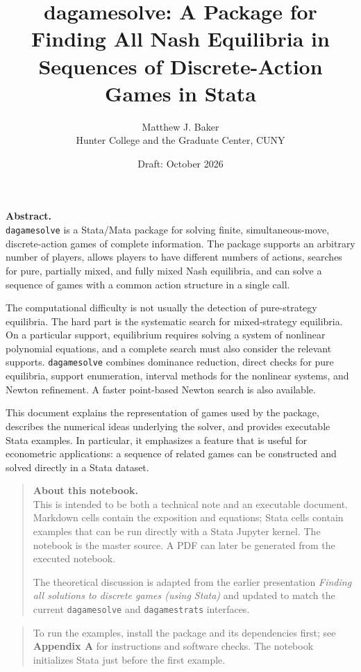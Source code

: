 \documentclass[11pt]{article}
\title{dagamesolve: A Package for Finding All Nash Equilibria in Sequences of Discrete-Action Games in Stata}
\date{Draft: October 2026}
\author{Matthew J. Baker\\[0.25em]\small Hunter College and the Graduate Center, CUNY}
\begin{document}
    
    \maketitle
    
    

    
    \textbf{Abstract.}\\
\texttt{dagamesolve} is a Stata/Mata package for solving finite,
simultaneous-move, discrete-action games of complete information. The
package supports an arbitrary number of players, allows players to have
different numbers of actions, searches for pure, partially mixed, and
fully mixed Nash equilibria, and can solve a sequence of games with a
common action structure in a single call.

The computational difficulty is not usually the detection of
pure-strategy equilibria. The hard part is the systematic search for
mixed-strategy equilibria. On a particular support, equilibrium requires
solving a system of nonlinear polynomial equations, and a complete
search must also consider the relevant supports. \texttt{dagamesolve}
combines dominance reduction, direct checks for pure equilibria, support
enumeration, interval methods for the nonlinear systems, and Newton
refinement. A faster point-based Newton search is also available.

This document explains the representation of games used by the package,
describes the numerical ideas underlying the solver, and provides
executable Stata examples. In particular, it emphasizes a feature that
is useful for econometric applications: a sequence of related games can
be constructed and solved directly in a Stata dataset.

    \begin{quote}
\textbf{About this notebook.}\\
This is intended to be both a technical note and an executable document.
Markdown cells contain the exposition and equations; Stata cells contain
examples that can be run directly with a Stata Jupyter kernel. The
notebook is the master source. A PDF can later be generated from the
executed notebook.

The theoretical discussion is adapted from the earlier presentation
\emph{Finding all solutions to discrete games (using Stata)} and updated
to match the current \texttt{dagamesolve} and \texttt{dagamestrats}
interfaces.
\end{quote}

\begin{quote}
To run the examples, install the package and its dependencies first; see
\textbf{Appendix A} for instructions and software checks. The notebook
initializes Stata just before the first example.
\end{quote}
\end{document}
